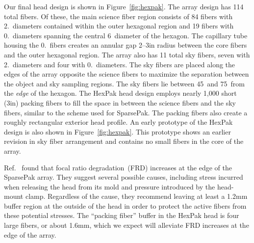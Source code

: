 Our final head design is shown in Figure~\ref{fig:hexpak}.  The array design
has 114 total fibers.  Of these, the main science fiber region consists of 84
fibers with 2.\ diameters contained within the outer hexagonal region
and 19 fibers with 0.\ diameters spanning the central
6\arcsec\ diameter of the hexagon.  The capillary tube housing the
0.\ fibers creates an annular gap 2--3\arcsec in radius between the
core fibers and the outer hexagonal region.  The array also has 11 total sky
fibers, seven with 2.\ diameters and four with 0.\ diameters.
The sky fibers are placed along the edges of the array opposite the science
fibers to maximize the separation between the object and sky sampling regions.
The sky fibers lie between 45\arcsec\ and 75\arcsec\ from the \emph{edge} of
the hexagon.  The HexPak head design employs nearly 1,000 short (3in) packing
fibers to fill the space in between the science fibers and the sky fibers,
similar to the scheme used for SparsePak.  The packing fibers also create a
roughly rectangular exterior head profile.  An early prototype of the HexPak
design is also shown in Figure~\ref{fig:hexpak}.  This prototype shows an
earlier revision in sky fiber arrangement and contains no small fibers in the
core of the array.


Ref.~ found that focal ratio
degradation\footnotemark\ (FRD) increases at the edge of the SparsePak array.
  They suggest several possible causes,
including stress incurred when releasing the head from its mold and pressure
introduced by the head-mount clamp.  Regardless of the cause, they recommend
leaving at least a 1.2mm buffer region at the outside of the head in order to
protect the active fibers from these potential stresses.  The ``packing
fiber'' buffer in the HexPak head is four large fibers, or about 1.6mm, which
we expect will alleviate FRD increases at the edge of the array.


\subsubsection{\GP}
\label{GPBsubsub:sec:gradhead}


